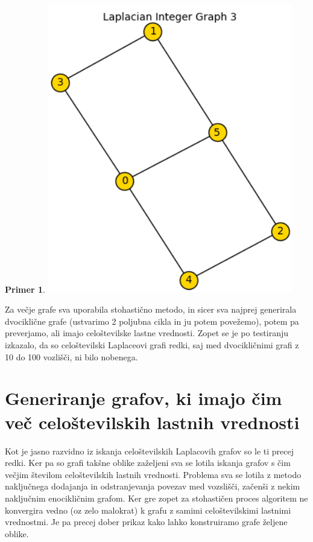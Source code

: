 \documentclass{article}
\newtheorem{primer}{Primer}
\begin{document}
\begin{primer}
\begin{minipage}{0.3\textwidth}
    \end{minipage}
    \begin{minipage}{0.3\textwidth}
        \centering
        \includegraphics[width=0.8\textwidth]{dvociklični3.png}
    \end{minipage}
    \par
    
\end{primer}

Za večje grafe sva uporabila stohastično metodo, in sicer sva najprej generirala dvociklične grafe (ustvarimo
2 poljubna cikla in ju potem povežemo), potem pa preverjamo, ali imajo celoštevilske lastne vrednosti. Zopet se je po testiranju izkazalo, da so celoštevilski
Laplaceovi grafi redki, saj med dvocikličnimi grafi z 10 do 100 vozlišči, ni bilo nobenega.

\section{Generiranje grafov, ki imajo čim več celoštevilskih lastnih vrednosti}
Kot je jasno razvidno iz iskanja celoštevilskih Laplacovih grafov so le ti precej redki. 
Ker pa so grafi takšne oblike zaželjeni sva se lotila iskanja grafov s čim večjim številom 
celoštevilskih lastnih vrednosti. Problema sva se lotila z metodo naključnega dodajanja in odstranjevanja
povezav med vozslišči, začenši z nekim naključnim enocikličnim grafom. Ker gre zopet za stohastičen proces
algoritem ne konvergira vedno (oz zelo malokrat) k grafu z samimi celoštevilskimi lastnimi vrednostmi. Je pa 
precej dober prikaz kako lahko konstruiramo grafe željene oblike.
\end{document}
